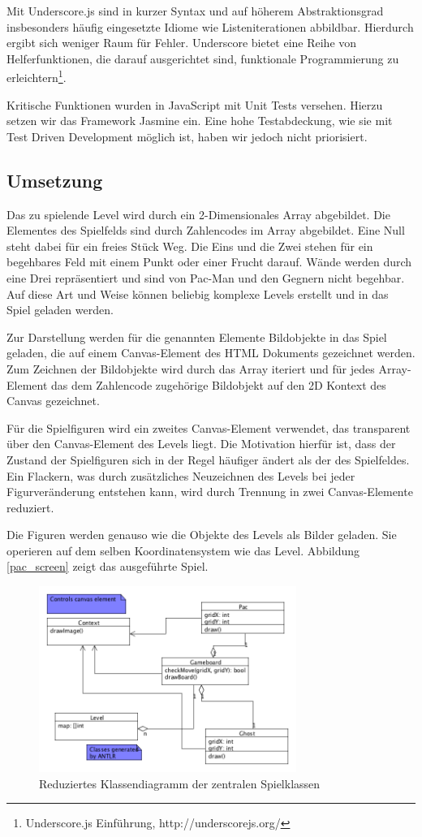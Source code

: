 \documentclass[conference]{IEEEtran}
\begin{document}
Mit Underscore.js sind in kurzer Syntax und auf höherem Abstraktionsgrad insbesonders häufig eingesetzte Idiome wie Listeniterationen abbildbar. Hierdurch ergibt sich weniger Raum für Fehler. Underscore bietet eine Reihe von Helferfunktionen, die darauf ausgerichtet sind, funktionale Programmierung zu erleichtern\footnote[1]{Underscore.js Einführung, http://underscorejs.org/}.

Kritische Funktionen wurden in JavaScript mit Unit Tests versehen. Hierzu setzen wir das Framework Jasmine ein. Eine hohe Testabdeckung, wie sie mit Test Driven Development möglich ist, haben wir jedoch nicht priorisiert.

\subsection{Umsetzung}
\label{umsetz}
Das zu spielende Level  wird durch ein 2-Dimensionales Array abgebildet. Die Elementes des Spielfelds sind durch Zahlencodes im Array abgebildet. Eine Null steht dabei für ein freies Stück Weg. Die Eins und die Zwei stehen für ein begehbares Feld mit einem Punkt oder einer Frucht darauf. Wände werden durch eine Drei repräsentiert und sind von Pac-Man und den Gegnern nicht begehbar. Auf diese Art und Weise können beliebig komplexe Levels erstellt und in das Spiel geladen werden.

Zur Darstellung werden für die genannten Elemente Bildobjekte in das Spiel geladen, die auf einem Canvas-Element des HTML Dokuments gezeichnet werden. Zum Zeichnen der Bildobjekte wird durch das Array iteriert und für jedes Array-Element das dem Zahlencode zugehörige Bildobjekt auf den 2D Kontext des Canvas gezeichnet.

Für die Spielfiguren wird ein zweites Canvas-Element verwendet, das transparent über den Canvas-Element des Levels liegt. Die Motivation hierfür ist, dass der Zustand der Spielfiguren sich in der Regel häufiger ändert als der des Spielfeldes. Ein Flackern, was durch zusätzliches Neuzeichnen des Levels bei jeder Figurveränderung entstehen kann, wird durch Trennung in zwei Canvas-Elemente reduziert.

Die Figuren werden  genauso wie die Objekte des Levels als Bilder geladen. Sie operieren auf dem selben Koordinatensystem wie das Level. Abbildung \ref{pac_screen} zeigt das ausgeführte Spiel.

\begin{figure}[!t]
\centering
\includegraphics[width=3.3in]{gameboard_and_figures.png}

\caption{Reduziertes Klassendiagramm der zentralen Spielklassen}
\label{main_classes}
\end{figure}
\end{document}
